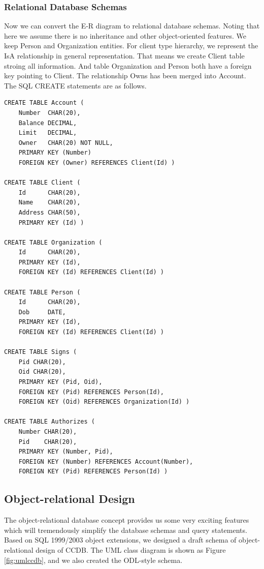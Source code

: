 \documentclass[11pt]{article}
\begin{document}
\subsubsection{Relational Database Schemas}
\par
Now we can convert the E-R diagram to relational database schemas. Noting that here we assume there is no inheritance and other object-oriented features. We keep Person and Organization entities. For client type hierarchy, we represent the IsA relationship in general representation. That means we create Client table stroing all information. And table Organization and Person both have a foreign key pointing to Client. The relationship Owns has been merged into Account. The SQL CREATE statements are as follows.
\begin{verbatim}
CREATE TABLE Account (
    Number  CHAR(20),
    Balance DECIMAL,
    Limit   DECIMAL,
    Owner   CHAR(20) NOT NULL,
    PRIMARY KEY (Number)
    FOREIGN KEY (Owner) REFERENCES Client(Id) )

CREATE TABLE Client (
    Id      CHAR(20),
    Name    CHAR(20),
    Address CHAR(50),
    PRIMARY KEY (Id) )

CREATE TABLE Organization (
    Id      CHAR(20),
    PRIMARY KEY (Id),
    FOREIGN KEY (Id) REFERENCES Client(Id) )

CREATE TABLE Person (
    Id      CHAR(20),
    Dob     DATE,
    PRIMARY KEY (Id),
    FOREIGN KEY (Id) REFERENCES Client(Id) )

CREATE TABLE Signs (
    Pid CHAR(20),
    Oid CHAR(20),
    PRIMARY KEY (Pid, Oid),
    FOREIGN KEY (Pid) REFERENCES Person(Id),
    FOREIGN KEY (Oid) REFERENCES Organization(Id) )

CREATE TABLE Authorizes (
    Number CHAR(20),
    Pid    CHAR(20),
    PRIMARY KEY (Number, Pid),
    FOREIGN KEY (Number) REFERENCES Account(Number),
    FOREIGN KEY (Pid) REFERENCES Person(Id) )
\end{verbatim}

\subsection{Object-relational Design}

\par
The object-relational database concept provides us some very exciting features which will tremendously simplify the database schemas and query statements. Based on SQL 1999/2003 object extensions, we designed a draft schema of object-relational design of CCDB. The UML class diagram is shown as Figure \ref{fig:umlccdb}, and we also created the ODL-style schema.
\end{document}
